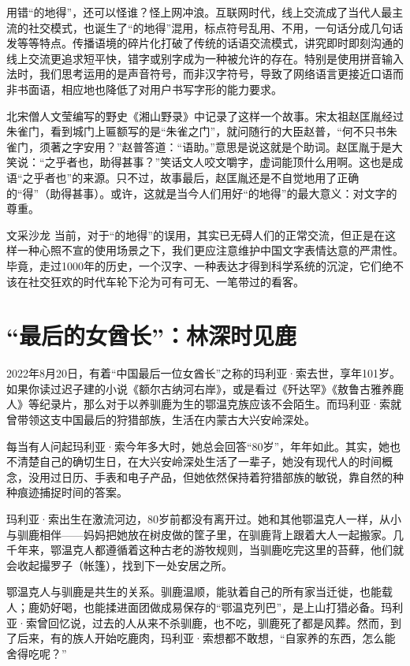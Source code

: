 用错“的地得”，还可以怪谁？怪上网冲浪。互联网时代，线上交流成了当代人最主流的社交模式，也诞生了“的地得”混用，标点符号乱用、不用，一句话分成几句话发等等特点。传播语境的碎片化打破了传统的话语交流模式，讲究即时即刻沟通的线上交流更追求短平快，错字或别字成为一种被允许的存在。特别是使用拼音输入法时，我们思考运用的是声音符号，而非汉字符号，导致了网络语言更接近口语而非书面语，相应地也降低了对用户书写字形的能力要求。

北宋僧人文莹编写的野史《湘山野录》中记录了这样一个故事。宋太祖赵匡胤经过朱雀门，看到城门上匾额写的是“朱雀之门”，就问随行的大臣赵普，“何不只书朱雀门，须著之字安用？”赵普答道：“语助。”意思是说这就是个助词。赵匡胤于是大笑说：“之乎者也，助得甚事？”笑话文人咬文嚼字，虚词能顶什么用啊。这也是成语“之乎者也”的来源。只不过，故事最后，赵匡胤还是不自觉地用了正确的“得”（助得甚事）。或许，这就是当今人们用好“的地得”的最大意义：对文字的尊重。

\begin{quoteBox}{文采沙龙}
当前，对于“的地得”的误用，其实已无碍人们的正常交流，但正是在这样一种心照不宣的使用场景之下，我们更应注意维护中国文字表情达意的严肃性。毕竟，走过1000年的历史，一个汉字、一种表达才得到科学系统的沉淀，它们绝不该在社交狂欢的时代车轮下沦为可有可无、一笔带过的看客。
\end{quoteBox}

\clearpage
\section*{“最后的女酋长”：林深时见鹿}

2022年8月20日，有着“中国最后一位女酋长”之称的玛利亚·索去世，享年101岁。如果你读过迟子建的小说《额尔古纳河右岸》，或是看过《歼达罕》《敖鲁古雅养鹿人》等纪录片，那么对于以养驯鹿为生的鄂温克族应该不会陌生。而玛利亚·索就曾带领这支中国最后的狩猎部族，生活在内蒙古大兴安岭深处。

每当有人问起玛利亚·索今年多大时，她总会回答“80岁”，年年如此。其实，她也不清楚自己的确切生日，在大兴安岭深处生活了一辈子，她没有现代人的时间概念，没用过日历、手表和电子产品，但她依然保持着狩猎部族的敏锐，靠自然的种种痕迹捕捉时间的答案。

玛利亚·索出生在激流河边，80岁前都没有离开过。她和其他鄂温克人一样，从小与驯鹿相伴——妈妈把她放在树皮做的筐子里，在驯鹿背上跟着大人一起搬家。几千年来，鄂温克人都遵循着这种古老的游牧规则，当驯鹿吃完这里的苔藓，他们就会收起撮罗子（帐篷），找到下一处安居之所。

鄂温克人与驯鹿是共生的关系。驯鹿温顺，能驮着自己的所有家当迁徙，也能载人；鹿奶好喝，也能揉进面团做成易保存的“鄂温克列巴”，是上山打猎必备。玛利亚·索曾回忆说，过去的人从来不杀驯鹿，也不吃，驯鹿死了都是风葬。然而，到了后来，有的族人开始吃鹿肉，玛利亚·索想都不敢想，“自家养的东西，怎么能舍得吃呢？”

